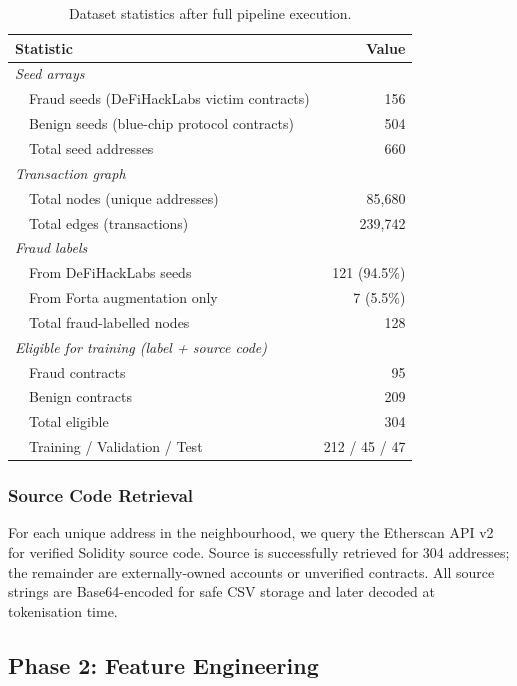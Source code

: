 \begin{table}[t]
\centering
\caption{Dataset statistics after full pipeline execution.}
\label{tab:dataset}
\begin{tabular}{lr}
\toprule
Statistic & Value \\
\midrule
\multicolumn{2}{l}{\textit{Seed arrays}} \\
\ \ Fraud seeds (DeFiHackLabs victim contracts) & 156 \\
\ \ Benign seeds (blue-chip protocol contracts) & 504 \\
\ \ Total seed addresses & 660 \\
\midrule
\multicolumn{2}{l}{\textit{Transaction graph}} \\
\ \ Total nodes (unique addresses) & 85,680 \\
\ \ Total edges (transactions) & 239,742 \\
\midrule
\multicolumn{2}{l}{\textit{Fraud labels}} \\
\ \ From DeFiHackLabs seeds & 121 (94.5\%) \\
\ \ From Forta augmentation only & 7 (5.5\%) \\
\ \ Total fraud-labelled nodes & 128 \\
\midrule
\multicolumn{2}{l}{\textit{Eligible for training (label + source code)}} \\
\ \ Fraud contracts & 95 \\
\ \ Benign contracts & 209 \\
\ \ Total eligible & 304 \\
\ \ Training / Validation / Test & 212 / 45 / 47 \\
\bottomrule
\end{tabular}
\end{table}

\subsubsection{Source Code Retrieval}
For each unique address in the neighbourhood, we query the Etherscan
API v2~\cite{etherscanapi} for verified Solidity source code.  Source
is successfully retrieved for \num{304} addresses; the remainder are
externally-owned accounts or unverified contracts.  All source strings
are Base64-encoded for safe CSV storage and later decoded at tokenisation
time.

\subsection{Phase 2: Feature Engineering}
\label{subsec:features}

